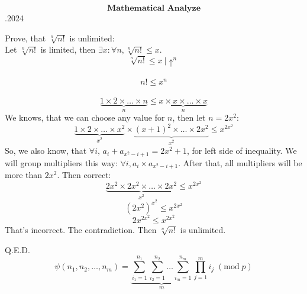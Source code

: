 \documentclass[12pt, a4paper]{article}
\begin{document}
	\begin{center}
		\LARGE
		\[\textbf{Mathematical Analyze}\].2024
	\end{center}
	\centering
	\Large
	\begin{flushleft}
		Prove, that \(\sqrt[n]{n!}\) is unlimited:\\
		Let \(\sqrt[n]{n!}\) is limited, then \(\exists x: \forall n, \sqrt[n]{n!} \leq x\).\\
		\[\sqrt[n]{n!} \leq x\ | \uparrow^{n}\]\\
		\[n! \leq x^n\]\\
		\[\underbrace{1\times2\times\ldots\times n}_{n} \leq \underbrace{x\times x\times\ldots\times x}_{n}\] 
		We knows, that we can choose any value for \(n\), then let \(n = 2x^2\):
		\[\underbrace{1\times2\times\ldots\times x^2}_{x^2}\times \underbrace{(x+1)^2\times\ldots\times2x^2}_{x^2} \leq x^{2x^2}\]
		So, we also know, that \(\forall i,\,a_i+a_{x^2-i+1} = 2x^2+1\), for left side of inequality. We will group multipliers this way: \(\forall i, a_i\times a_{x^2-i+1}\). After that, all multipliers will be more than \(2x^2\). Then correct:
		\[\underbrace{2x^2\times 2x^2\times\ldots\times2x^2}_{x^2} \leq x^{2x^2}\]
		\[(2x^2)^{x^2}\leq x^{2x^2}\]
		\[2x^{2x^2} \leq x^{2x^2}\]
		That's incorrect. The contradiction. Then \(\sqrt[n]{n!}\) is unlimited.
	\end{flushleft}
	 Q.E.D.
	 \[
		 \psi(n_1,n_2,\ldots,n_m) = \underbrace{\sum_{i_1 = 1}^{n_1}\sum_{i_2 = 1}^{n_2}\ldots\sum_{i_m = 1}^{n_m}}_{m}\prod\limits_{j = 1}^{m}i_j\;(\text{mod}\;p)
	 \]
\end{document}
